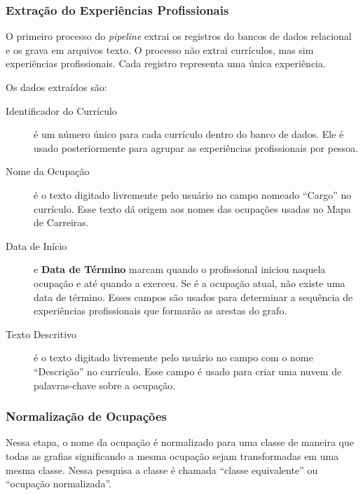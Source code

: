 \documentclass[12pt,a4paper,final]{article}
\begin{document}
\subsubsection{Extração do Experiências Profissionais} \label{sec:extracao-experiencia}

O primeiro processo do \textit{pipeline} extrai os registros do bancos de dados relacional e os grava em arquivos texto. O processo não extrai currículos, mas sim experiências profissionais. Cada registro representa uma única experiência.

Os dados extraídos são:

\begin{description}

  \item[Identificador do Currículo] é um número único para cada currículo dentro do banco de dados. Ele é usado posteriormente para agrupar as experiências profissionais por pessoa.

  \item[Nome da Ocupação] é o texto digitado livremente pelo usuário no campo nomeado \enquote{Cargo} no currículo. Esse texto dá origem aos nomes das ocupações usadas no Mapa de Carreiras.

  \item[Data de Início] e \textbf{Data de Término} marcam quando o profissional iniciou naquela ocupação e até quando a exerceu. Se é a ocupação atual, não existe uma data de término. Esses campos são usados para determinar a sequência de experiências profissionais que formarão as arestas do grafo.

  \item[Texto Descritivo] é o texto digitado livremente pelo usuário no campo com o nome \enquote{Descrição} no currículo. Esse campo é usado para criar uma nuvem de palavras-chave sobre a ocupação.

\end{description}

\subsubsection{Normalização de Ocupações} \label{sec:normalizacao}

Nessa etapa, o nome da ocupação é normalizado para uma classe de maneira que todas as grafias significando a mesma ocupação sejam transformadas em uma mesma classe. Nessa pesquisa a classe é chamada \enquote{classe equivalente} ou \enquote{ocupação normalizada}.
\end{document}
